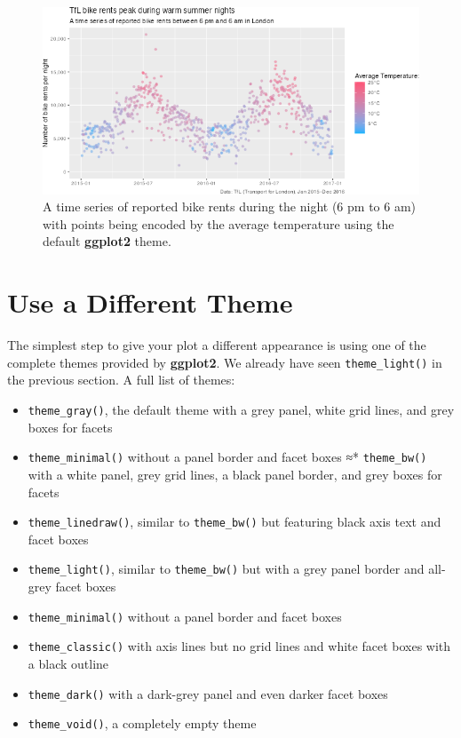 \documentclass[
]{krantz}
\providecommand{\tightlist}{%
  \setlength{\itemsep}{0pt}\setlength{\parskip}{0pt}}
\begin{document}
\begin{figure}
\centering
\includegraphics{bookdown_files/figure-latex/05basicPlot-1.png}
\caption{\label{fig:05basicPlot}A time series of reported bike rents during the night (6 pm to 6 am) with points being encoded by the average temperature using the default \textbf{ggplot2} theme.}
\end{figure}

\hypertarget{use-a-different-theme}{%
\section{Use a Different Theme}\label{use-a-different-theme}}

The simplest step to give your plot a different appearance is using one of the complete themes provided by \textbf{ggplot2}. We already have seen \texttt{theme\_light()} in the previous section. A full list of themes:

\begin{itemize}
\tightlist
\item
  \texttt{theme\_gray()}, the default theme with a grey panel, white grid lines, and grey boxes for facets
\item
  \texttt{theme\_minimal()} without a panel border and facet boxes
  ≈* \texttt{theme\_bw()} with a white panel, grey grid lines, a black panel border, and grey boxes for facets
\item
  \texttt{theme\_linedraw()}, similar to \texttt{theme\_bw()} but featuring black axis text and facet boxes
\item
  \texttt{theme\_light()}, similar to \texttt{theme\_bw()} but with a grey panel border and all-grey facet boxes
\item
  \texttt{theme\_minimal()} without a panel border and facet boxes
\item
  \texttt{theme\_classic()} with axis lines but no grid lines and white facet boxes with a black outline
\item
  \texttt{theme\_dark()} with a dark-grey panel and even darker facet boxes
\item
  \texttt{theme\_void()}, a completely empty theme
\end{itemize}
\end{document}
